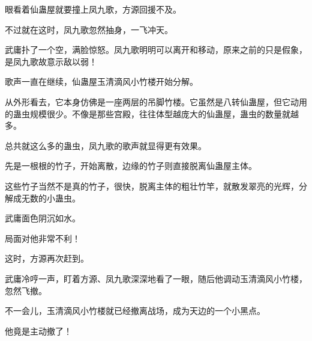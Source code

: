 \begin{this_body}
眼看着仙蛊屋就要撞上凤九歌，方源回援不及。

不过就在这时，凤九歌忽然抽身，一飞冲天。

武庸扑了一个空，满脸惊怒。凤九歌明明可以离开和移动，原来之前的只是假象，是凤九歌故意示敌以弱！

歌声一直在继续，仙蛊屋玉清滴风小竹楼开始分解。

从外形看去，它本身仿佛是一座两层的吊脚竹楼。它虽然是八转仙蛊屋，但它动用的蛊虫规模很少。不像是那些宫殿，往往体型越庞大的仙蛊屋，蛊虫的数量就越多。

总共就这么多的蛊虫，凤九歌的歌声就显得更有效果。

先是一根根的竹子，开始离散，边缘的竹子则直接脱离仙蛊屋主体。

这些竹子当然不是真的竹子，很快，脱离主体的粗壮竹竿，就散发翠亮的光辉，分解成无数的小蛊虫。

武庸面色阴沉如水。

局面对他非常不利！

这时，方源再次赶到。

武庸冷哼一声，盯着方源、凤九歌深深地看了一眼，随后他调动玉清滴风小竹楼，忽然飞撤。

不一会儿，玉清滴风小竹楼就已经撤离战场，成为天边的一个小黑点。

他竟是主动撤了！

\end{this_body}

